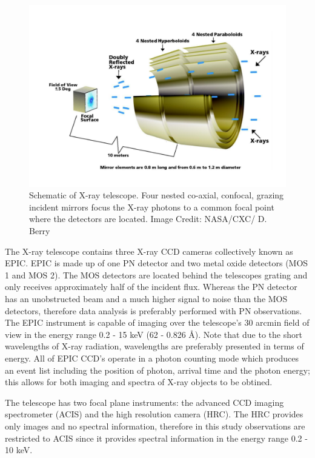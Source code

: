 \begin{figure}
    \centering
    \includegraphics[scale=0.45]{Figures/3-Xray_age/chandra_scheme.pdf}
    \caption[Schematic of \Chandra X-ray telescope]{Schematic of \Chandra X-ray telescope. Four nested co-axial, confocal, grazing incident mirrors focus the X-ray photons to a common focal point where the detectors are located. Image Credit: NASA/CXC/ D. Berry}
    \label{fig:diagram_xray_telescope}
\end{figure}

The \XMM X-ray telescope \citep{Jansen_etal_2001} contains three X-ray CCD cameras collectively known as EPIC. EPIC is made up of one PN detector and two metal oxide detectors (MOS 1 and MOS 2). The MOS detectors are located behind the telescopes grating and only receives approximately half of the incident flux. Whereas the PN detector has an unobstructed beam and a much higher signal to noise than the MOS detectors, therefore data analysis is preferably performed with PN observations. The EPIC instrument is capable of imaging over the telescope's 30 arcmin field of view in the energy range 0.2 - 15 keV (62 - 0.826 \AA). Note that due to the short wavelengths of X-ray radiation, wavelengths are preferably presented in terms of energy. All of EPIC CCD's operate in a photon counting mode which produces an event list including the position of photon, arrival time and the photon energy; this allows for both imaging and spectra of X-ray objects to be obtined.

The \Chandra telescope \citep{Weisskopf_etal_2000} has two focal plane instruments: the advanced CCD imaging spectrometer (ACIS) and the high resolution camera (HRC). The HRC provides only images and no spectral information, therefore in this study observations are restricted to ACIS since it provides spectral information in the energy range 0.2 - 10 keV.

